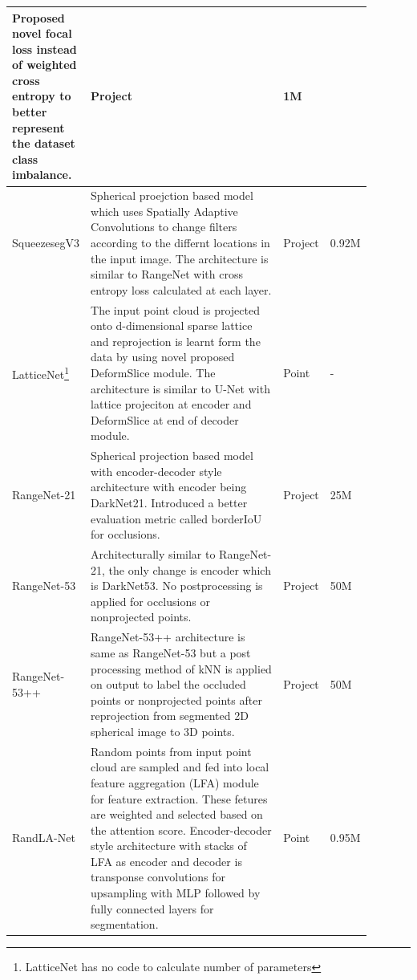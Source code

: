 \begin{longtable}{|p{0.15\linewidth} | p{0.59\linewidth}| p{0.06\linewidth} |p{0.09\linewidth}|}
        Proposed novel focal loss instead of weighted cross entropy to better represent the dataset class imbalance.
        & Project & 1M \\
        \hline
        SqueezesegV3\cite{xu2020squeezesegv3} &
        Spherical proejction based model which uses Spatially Adaptive Convolutions to change filters according to the differnt locations in the input image.
        The architecture is similar to RangeNet with cross entropy loss calculated at each layer.
        & Project & 0.92M \\
        \hline
        LatticeNet\cite{rosu2019latticenet}\footnote{LatticeNet has no code to calculate number of parameters} &
        The input point cloud is projected onto d-dimensional sparse lattice and reprojection is learnt form the data by using novel proposed DeformSlice module.
        The architecture is similar to U-Net with lattice projeciton at encoder and DeformSlice at end of decoder module.
        & Point & - \\
        \hline
        RangeNet-21\cite{Milioto2019} & 
        Spherical projection based model with encoder-decoder style architecture with encoder being DarkNet21.
        Introduced a better evaluation metric called borderIoU for occlusions.
        & Project & 25M \\
        \hline
        RangeNet-53\cite{Milioto2019}  & 
        Architecturally similar to RangeNet-21, the only change is encoder which is DarkNet53.
        No postprocessing is applied for occlusions or nonprojected points.
        & Project & 50M \\
        \hline
        RangeNet-53++\cite{Milioto2019} &
        RangeNet-53++ architecture is same as RangeNet-53 but a post processing 
        method of kNN is applied on output to label the occluded points or nonprojected points after reprojection from segmented 2D spherical image to 3D points.
        & Project & 50M \\
        \hline
        RandLA-Net\cite{Hu_2020_CVPR_Randla} & 
        Random points from input point cloud are sampled and fed into local feature aggregation (LFA) module for feature extraction.
        These fetures are weighted and selected based on the attention score. 
        Encoder-decoder style architecture with stacks of LFA as encoder and decoder is transponse convolutions for upsampling with MLP followed by fully connected layers for segmentation.
        & Point & 0.95M \\

\end{longtable}
